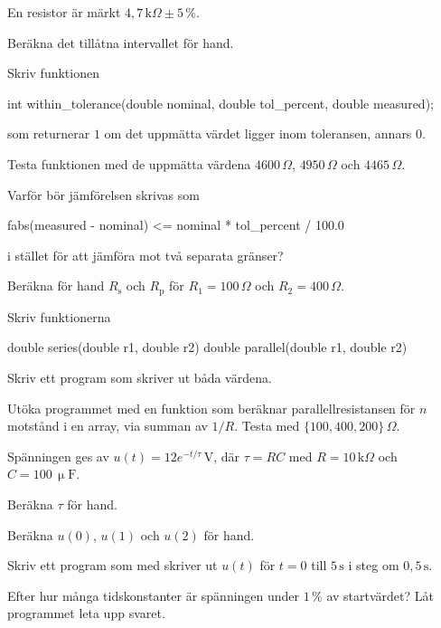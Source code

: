 En resistor är märkt $4{,}7\,\text{k}\Omega \pm 5\,\%$.
\begin{parts}
  \item Beräkna det tillåtna intervallet för hand.
  \item Skriv funktionen
\begin{ccode}
int within_tolerance(double nominal, double tol_percent, double measured);
\end{ccode}
    som returnerar $1$ om det uppmätta värdet ligger inom toleransen, annars $0$.
  \item Testa funktionen med de uppmätta värdena $4600\,\Omega$, $4950\,\Omega$ och
    $4465\,\Omega$.
  \item Varför bör jämförelsen skrivas som
\begin{ccode}
fabs(measured - nominal) <= nominal * tol_percent / 100.0
\end{ccode}
    i stället för att jämföra mot två separata gränser?
\end{parts}

\begin{parts}
  \item Beräkna för hand $R_{\text{s}}$ och $R_{\text{p}}$ för $R_1 = 100\,\Omega$ och
    $R_2 = 400\,\Omega$.
  \item Skriv funktionerna
\begin{ccode}
double series(double r1, double r2)
double parallel(double r1, double r2)
\end{ccode}
  \item Skriv ett program som skriver ut båda värdena.
  \item Utöka programmet med en funktion som beräknar parallellresistansen för $n$ motstånd i en
    array, via summan av $1/R$. Testa med $\{100, 400, 200\}\,\Omega$.
\end{parts}

Spänningen ges av $u(t) = 12e^{-t/\tau}\,\text{V}$, där $\tau = RC$ med $R = 10\,\text{k}\Omega$
och $C = 100\,\upmu\text{F}$.
\begin{parts}
  \item Beräkna $\tau$ för hand.
  \item Beräkna $u(0)$, $u(1)$ och $u(2)$ för hand.
  \item Skriv ett program som med  skriver ut $u(t)$ för $t = 0$ till $5\,\text{s}$
    i steg om $0{,}5\,\text{s}$.
  \item Efter hur många tidskonstanter är spänningen under $1\,\%$ av startvärdet? Låt programmet
    leta upp svaret.
\end{parts}

